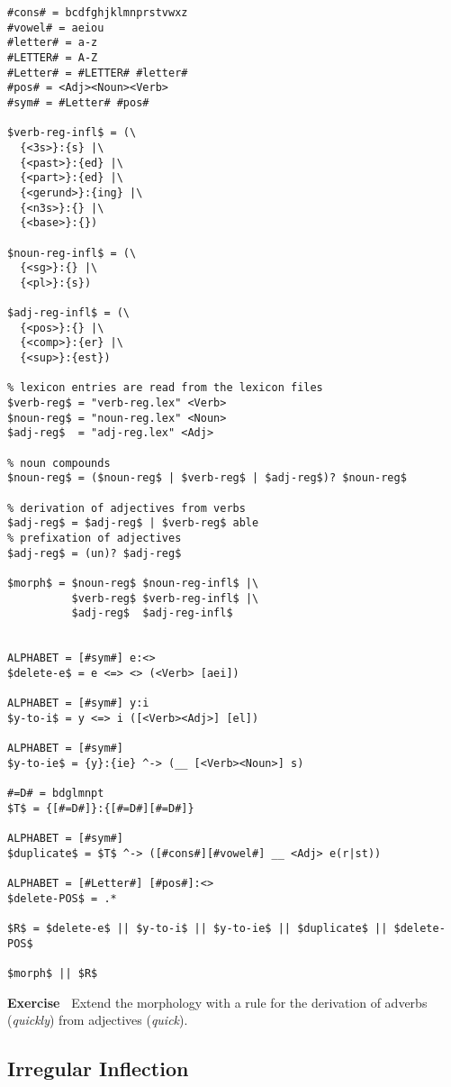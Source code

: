 \documentclass[11pt]{article}
\newenvironment{exercise}{

  \hrulefill\nopagebreak

  \textbf{Exercise~}}
{

  \nopagebreak\hrulefill\vspace{0.2cm}

}
\begin{document}
\begin{verbatim}
#cons# = bcdfghjklmnprstvwxz
#vowel# = aeiou
#letter# = a-z
#LETTER# = A-Z
#Letter# = #LETTER# #letter#
#pos# = <Adj><Noun><Verb>
#sym# = #Letter# #pos#

$verb-reg-infl$ = (\
  {<3s>}:{s} |\
  {<past>}:{ed} |\
  {<part>}:{ed} |\
  {<gerund>}:{ing} |\
  {<n3s>}:{} |\
  {<base>}:{})

$noun-reg-infl$ = (\
  {<sg>}:{} |\
  {<pl>}:{s})

$adj-reg-infl$ = (\
  {<pos>}:{} |\
  {<comp>}:{er} |\
  {<sup>}:{est})

% lexicon entries are read from the lexicon files
$verb-reg$ = "verb-reg.lex" <Verb>
$noun-reg$ = "noun-reg.lex" <Noun>
$adj-reg$  = "adj-reg.lex" <Adj>

% noun compounds
$noun-reg$ = ($noun-reg$ | $verb-reg$ | $adj-reg$)? $noun-reg$

% derivation of adjectives from verbs
$adj-reg$ = $adj-reg$ | $verb-reg$ able
% prefixation of adjectives
$adj-reg$ = (un)? $adj-reg$

$morph$ = $noun-reg$ $noun-reg-infl$ |\
          $verb-reg$ $verb-reg-infl$ |\
          $adj-reg$  $adj-reg-infl$


ALPHABET = [#sym#] e:<>
$delete-e$ = e <=> <> (<Verb> [aei])

ALPHABET = [#sym#] y:i
$y-to-i$ = y <=> i ([<Verb><Adj>] [el])

ALPHABET = [#sym#]
$y-to-ie$ = {y}:{ie} ^-> (__ [<Verb><Noun>] s)

#=D# = bdglmnpt
$T$ = {[#=D#]}:{[#=D#][#=D#]}

ALPHABET = [#sym#]
$duplicate$ = $T$ ^-> ([#cons#][#vowel#] __ <Adj> e(r|st))

ALPHABET = [#Letter#] [#pos#]:<>
$delete-POS$ = .*

$R$ = $delete-e$ || $y-to-i$ || $y-to-ie$ || $duplicate$ || $delete-POS$

$morph$ || $R$
\end{verbatim}

\begin{exercise}
  Extend the morphology with a rule for the derivation of adverbs
  (\emph{quickly}) from adjectives (\emph{quick}).
\end{exercise}

\subsection{Irregular Inflection}
\end{document}
